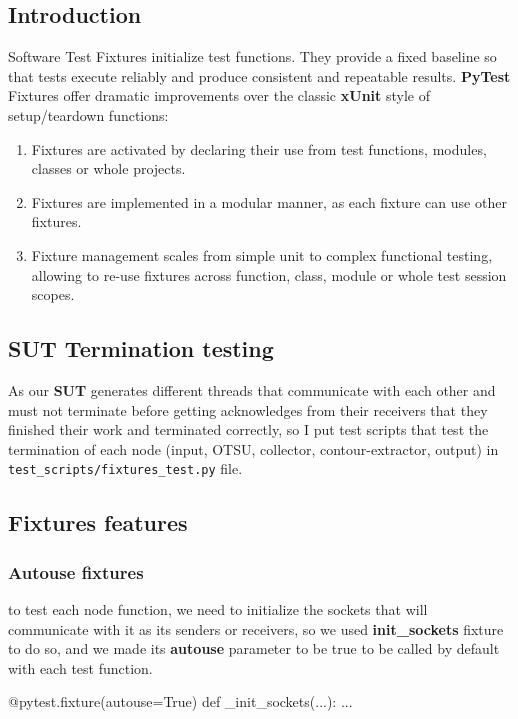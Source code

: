 \subsection{Introduction}
Software Test Fixtures initialize test functions. They provide a fixed baseline so that tests execute reliably and produce consistent and repeatable results. \textbf{PyTest} Fixtures offer dramatic improvements over the classic \textbf{xUnit} style of setup/teardown functions:

\begin{enumerate}
    \item Fixtures are activated by declaring their use from test functions, modules, classes or whole projects.
    \item Fixtures are implemented in a modular manner, as each fixture can use other fixtures.
    \item Fixture management scales from simple unit to complex functional testing, allowing to re-use fixtures across function, class, module or whole test session scopes.
\end{enumerate}

\subsection{SUT Termination testing}
As our \textbf{SUT} generates different threads that communicate with each other and must not terminate before getting acknowledges from their receivers that they finished their work and terminated correctly, so I put test scripts that test the termination of each node (input, OTSU, collector, contour-extractor, output) in \texttt{test\_scripts/fixtures\_test.py} file.

\subsection{Fixtures features}
\subsubsection{Autouse fixtures}
to test each node function, we need to initialize the sockets that will communicate with it as its senders or receivers, so we used \textbf{init\_sockets} fixture to do so, and we made its \textbf{autouse} parameter to be true to be called by default with each test function.

\begin{python}
@pytest.fixture(autouse=True)
def _init_sockets(...):
    ...
\end{python}

